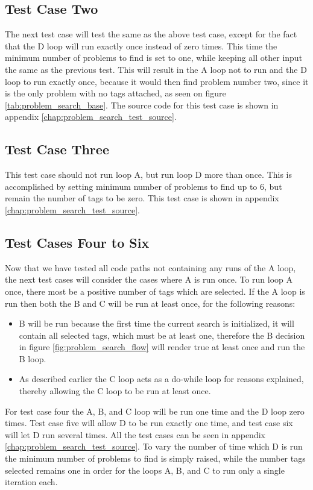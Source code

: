 \subsection{Test Case Two}
The next test case will test the same as the above test case, except for the fact that the D loop will run exactly once instead of zero times.
This time the minimum number of problems to find is set to one, while keeping all other input the same as the previous test.
This will result in the A loop not to run and the D loop to run exactly once, because it would then find problem number two, since it is the only problem with no tags attached, as seen on figure \ref{tab:problem_search_base}.
The source code for this test case is shown in appendix \ref{chap:problem_search_test_source}.

\subsection{Test Case Three}
This test case should not run loop A, but run loop D more than once.
This is accomplished by setting minimum number of problems to find up to 6, but remain the number of tags to be zero.
This test case is shown in appendix \ref{chap:problem_search_test_source}.

\subsection{Test Cases Four to Six}
Now that we have tested all code paths not containing any runs of the A loop, the next test cases will consider the cases where A is run once.
To run loop A once, there most be a positive number of tags which are selected.
If the A loop is run then both the B and C will be run at least once, for the following reasons:
\begin{itemize}
	\item B will be run because the first time the current search is initialized, it will contain all selected tags, which must be at least one, therefore the B decision in figure \ref{fig:problem_search_flow} will render true at least once and run the B loop.
	\item As described earlier the C loop acts as a do-while loop for reasons explained, thereby allowing the C loop to be run at least once.
\end{itemize}

For test case four the A, B, and C loop will be run one time and the D loop zero times.
Test case five will allow D to be run exactly one time, and test case six will let D run several times.
All the test cases can be seen in appendix \ref{chap:problem_search_test_source}.
To vary the number of time which D is run the minimum number of problems to find is simply raised, while the number tags selected remains one in order for the loops A, B, and C to run only a single iteration each.

